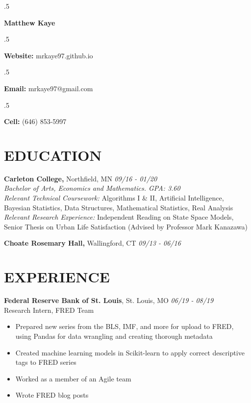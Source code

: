 \documentclass[margin, 10pt]{res} %
\begin{document}
\singlespacing

\moveleft.5\hoffset\centerline{\LARGE\bf Matthew Kaye} %
\medskip
\moveleft.5\hoffset\centerline{\textbf{Website:} mrkaye97.github.io}
\moveleft.5\hoffset\centerline{\textbf{Email:} mrkaye97@gmail.com}
\moveleft.5\hoffset\centerline{\textbf{Cell:} (646) 853-5997}


\begin{resume}


\section{EDUCATION}

{\sl} \textbf{Carleton College,} Northfield, MN \hfill \textit{09/16 - 01/20}\\
{\sl Bachelor of Arts, Economics and Mathematics. GPA: 3.60} \smallskip\\
{\sl Relevant Technical Coursework: } Algorithms I \& II, Artificial Intelligence, Bayesian Statistics, Data Structures, Mathematical Statistics, Real Analysis \smallskip\\
{\sl Relevant Research Experience: } Independent Reading on State Space Models, Senior Thesis on Urban Life Satisfaction (Advised by Professor Mark Kanazawa)

{\sl} \textbf{Choate Rosemary Hall,} Wallingford, CT \hfill \textit{09/13 -  06/16}

\section{EXPERIENCE}
{\sl} \textbf{Federal Reserve Bank of St. Louis}, St. Louis, MO \hfill \textit{06/19 - 08/19}\\
{\sl} Research Intern, FRED Team \smallskip
{\sl} \begin{itemize}
	\item Prepared new series from the BLS, IMF, and more for upload to FRED, using Pandas for data wrangling and creating thorough metadata
	\item Created machine learning models in Scikit-learn to apply correct descriptive tags to FRED series
	\item Worked as a member of an Agile team
	\item Wrote FRED blog posts
\end{itemize}


\end{resume}
\end{document}
